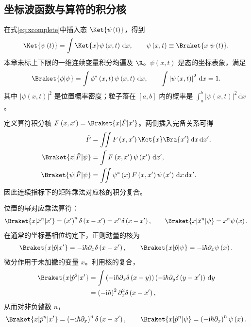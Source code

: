 \subsection{坐标波函数与算符的积分核}
在式\eqref{eq:xcomplete}中插入态 $\Ket{\psi\left(t\right)}$，得到
\begin{equation}
\Ket{\psi\left(t\right)}=\int\Ket{x}\psi\left(x,t\right)\,\mathrm{d}x,\qquad
\psi\left(x,t\right)\equiv\Braket{x|\psi\left(t\right)}.
\end{equation}
本章未标上下限的一维连续变量积分均遍及 $\R$。$\psi\left(x,t\right)$ 是态的坐标表象，满足
\begin{equation}
\Braket{\phi|\psi}=\int\phi^*\left(x,t\right)\psi\left(x,t\right)\,\mathrm{d}x,
\qquad\int\left|\psi\left(x,t\right)\right|^2\,\mathrm{d}x=1.
\end{equation}
其中 $\left|\psi\left(x,t\right)\right|^2$ 是位置概率密度；粒子落在 $\left[a,b\right]$ 内的概率是
$\int_a^b\left|\psi\left(x,t\right)\right|^2\,\mathrm{d}x$。

定义算符积分核 $F\left(x,x'\right)=\Braket{x|\hat F|x'}$。两侧插入完备关系可得
\begin{align}
\hat F&=\iint F\left(x,x'\right)\Ket{x}\Bra{x'}\,\mathrm{d}x\,\mathrm{d}x',\\
\Braket{x|\hat F|\psi}&=\int F\left(x,x'\right)\psi\left(x'\right)\,\mathrm{d}x',\\
\Braket{\psi|\hat F|\psi}&=\iint\psi^*\left(x\right)F\left(x,x'\right)\psi\left(x'\right)\,\mathrm{d}x\,\mathrm{d}x'.
\end{align}
因此连续指标下的矩阵乘法对应核的积分复合。

位置的幂对应乘法算符：
\begin{equation}
\Braket{x|\hat x^n|x'}=\left(x'\right)^n\delta\left(x-x'\right)=x^n\delta\left(x-x'\right),\qquad
\Braket{x|\hat x^n|\psi}=x^n\psi\left(x\right).
\end{equation}
在通常的坐标基相位约定下，正则动量的核为
\begin{equation}
\Braket{x|\hat p|x'}=-\mathrm{i}\hbar\partial_x\delta\left(x-x'\right),\qquad
\Braket{x|\hat p|\psi}=-\mathrm{i}\hbar\partial_x\psi\left(x\right).
\label{eq:p-kernel}
\end{equation}
微分作用于未加撇的变量 $x$。利用核的复合，
\begin{align}
\Braket{x|\hat p^2|x'}
&=\int\left(-\mathrm{i}\hbar\partial_x\delta\left(x-y\right)\right)
\left(-\mathrm{i}\hbar\partial_y\delta\left(y-x'\right)\right)\,\mathrm{d}y\\
&=\left(-\mathrm{i}\hbar\right)^2\partial_x^2\delta\left(x-x'\right),
\end{align}
从而对非负整数 $n$，
\begin{equation}
\Braket{x|\hat p^n|x'}=\left(-\mathrm{i}\hbar\partial_x\right)^n\delta\left(x-x'\right),\qquad
\Braket{x|\hat p^n|\psi}=\left(-\mathrm{i}\hbar\partial_x\right)^n\psi\left(x\right).
\end{equation}

